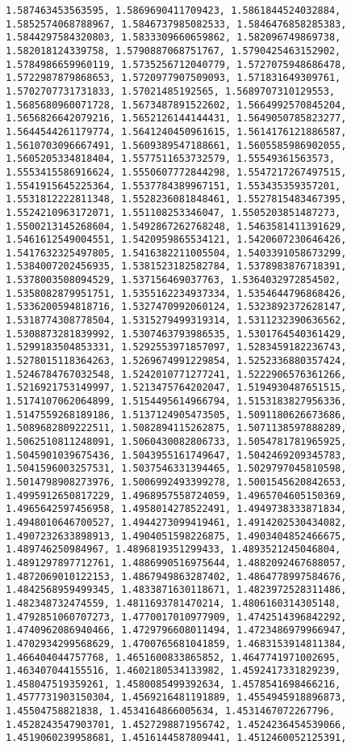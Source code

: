 \documentclass[11pt]{article}
\begin{document}
\begin{Verbatim}[commandchars=\\\{\}]
1.587463453563595, 1.5869690411709423, 1.5861844524032884, 1.5852574068788967, 1.5846737985082533, 1.5846476858285383, 1.5844297584320803, 1.5833309660659862, 1.582096749869738, 1.582018124339758, 1.5790887068751767, 1.5790425463152902, 1.5784986659960119, 1.5735256712040779, 1.5727075948686478, 1.5722987879868653, 1.5720977907509093, 1.571831649309761, 1.5702707731731833, 1.57021485192565, 1.5689707310129553, 1.5685680960071728, 1.5673487891522602, 1.5664992570845204, 1.5656826642079216, 1.5652126144144431, 1.5649050785823277, 1.5644544261179774, 1.5641240450961615, 1.5614176121886587, 1.5610703096667491, 1.5609389547188661, 1.5605585986902055, 1.5605205334818404, 1.5577511653732579, 1.55549361563573, 1.5553415586916624, 1.5550607772844298, 1.5547217267497515, 1.5541915645225364, 1.5537784389967151, 1.553435359357201, 1.5531812222811348, 1.5528236081848461, 1.5527815483467395, 1.5524210963172071, 1.551108253346047, 1.5505203851487273, 1.5500213145268604, 1.5492867262768248, 1.5463581411391629, 1.5461612549004551, 1.5420959865534121, 1.5420607230646426, 1.5417632325497805, 1.5416382211005504, 1.5403391058673299, 1.5384007202456935, 1.5381523182582784, 1.5378983876718391, 1.5378003508094529, 1.537156469037763, 1.5364032972854502, 1.5358082879951751, 1.5355162234937334, 1.5354644796868426, 1.5336200594818716, 1.5327470992060124, 1.5323892372628147, 1.5318774308778504, 1.5315279499319314, 1.5311232390636562, 1.5308873281839992, 1.5307463793986535, 1.5301764540361429, 1.5299183504853331, 1.5292553971857097, 1.5283459182236743, 1.5278015118364263, 1.5269674991229854, 1.5252336880357424, 1.5246784767032548, 1.5242010771277241, 1.5222906576361266, 1.5216921753149997, 1.5213475764202047, 1.5194930487651515, 1.5174107062064899, 1.5154495614966794, 1.5153183827956336, 1.5147559268189186, 1.5137124905473505, 1.5091180626673686, 1.5089682809222511, 1.5082894115262875, 1.5071138597888289, 1.5062510811248091, 1.5060430082806733, 1.5054781781965925, 1.5045901039675436, 1.5043955161749647, 1.5042469209345783, 1.5041596003257531, 1.5037546331394465, 1.5029797045810598, 1.5014798908273976, 1.5006992493399278, 1.5001545620842653, 1.4995912650817229, 1.4968957558724059, 1.4965704605150369, 1.4965642597456958, 1.4958014278522491, 1.4949738333871834, 1.4948010646700527, 1.4944273099419461, 1.4914202530434082, 1.4907232633898913, 1.4904051598226875, 1.4903404852466675, 1.489746250984967, 1.4896819351299433, 1.4893521245046804, 1.4891297897712761, 1.4886990516975644, 1.4882092467688057, 1.4872069010122153, 1.4867949863287402, 1.4864778997584676, 1.4842568959499345, 1.4833871630118671, 1.4823972528311486, 1.482348732474559, 1.4811693781470214, 1.4806160314305148, 1.4792851060707273, 1.4770017010977909, 1.4742514396842292, 1.4740962086940466, 1.4729796608011494, 1.4723486979966947, 1.4702934299568629, 1.4700765681041859, 1.4683153914811384, 1.466404044757768, 1.4651600833865852, 1.4647741971002695, 1.463407044155516, 1.4602180534133982, 1.4592417331829239, 1.458047519359261, 1.4580085499392634, 1.4578541698466216, 1.4577731903150304, 1.4569216481191889, 1.4554945918896873, 1.45504758821838, 1.4534164866005634, 1.4531467072267796, 1.4528243547903701, 1.4527298871956742, 1.4524236454539066, 1.4519060239958681, 1.4516144587809441, 1.4512460052125391, 
\end{Verbatim}
\end{document}
